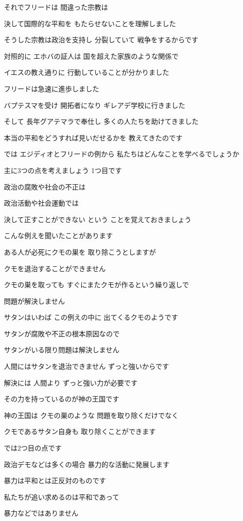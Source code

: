 \documentclass[twocolumn]{jsarticle}
\begin{document}
それでフリードは 間違った宗教は

決して国際的な平和を
もたらせないことを理解しました

そうした宗教は政治を支持し
分裂していて 戦争をするからです

対照的に エホバの証人は
国を超えた家族のような関係で

イエスの教え通りに
行動していることが分かりました

フリードは急速に進歩しました

バプテスマを受け 開拓者になり
ギレアデ学校に行きました

そして 長年グアテマラで奉仕し
多くの人たちを助けてきました

本当の平和をどうすれば見いだせるかを
教えてきたのです

では エジディオとフリードの例から
私たちはどんなことを学べるでしょうか

主に3つの点を考えましょう
1つ目です

政治の腐敗や社会の不正は

政治活動や社会運動では

決して正すことができない という
ことを覚えておきましょう

こんな例えを聞いたことがあります

ある人が必死にクモの巣を
取り除こうとしますが

クモを退治することができません

クモの巣を取っても
すぐにまたクモが作るという繰り返しで

問題が解決しません

サタンはいわば この例えの中に
出てくるクモのようです

サタンが腐敗や不正の根本原因なので

サタンがいる限り問題は解決しません

人間にはサタンを退治できません
ずっと強いからです

解決には 人間より
ずっと強い力が必要です

その力を持っているのが神の王国です

神の王国は クモの巣のような
問題を取り除くだけでなく

クモであるサタン自身も
取り除くことができます

では2つ目の点です

政治デモなどは多くの場合
暴力的な活動に発展します

暴力は平和とは正反対のものです

私たちが追い求めるのは平和であって

暴力などではありません
\end{document}
